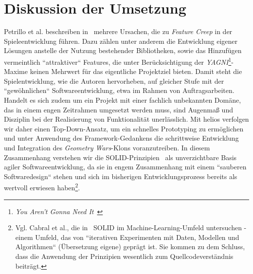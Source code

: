 \section{Diskussion der Umsetzung}

Petrillo et al. beschreiben in~\cite[]{PPTD08} mehrere Ursachen, die zu \textit{Feature Creep} in der Spieleentwicklung führen.
Dazu zählen unter anderem die Entwicklung eigener Lösungen anstelle der Nutzung bestehender Bibliotheken, sowie das Hinzufügen vermeintlich ``attraktiver`` Features, die unter Berücksichtigung der \textit{YAGNI}\footnote{\textit{You Aren't Gonna Need It}~\cite[]{Sch07}}-Maxime keinen Mehrwert für das eigentliche Projektziel bieten.
Damit steht die Spielentwicklung, wie die Autoren hervorheben, auf gleicher Stufe mit der ``gewöhnlichen`` Softwareentwicklung, etwa im Rahmen von Auftragsarbeiten.
Handelt es sich zudem um ein Projekt mit einer fachlich unbekannten Domäne, das in einem engen Zeitrahmen umgesetzt werden muss, sind Augenmaß und Disziplin bei der Realisierung von Funktionalität unerlässlich.
Mit helios verfolgen wir daher einen Top-Down-Ansatz, um ein schnelles Prototyping zu ermöglichen und unter Anwendung des Framework-Gedankens die schrittweise Entwicklung und Integration des \textit{Geometry Wars}-Klons voranzutreiben.
In diesem Zusammenhang verstehen wir die SOLID-Prinzipien~\cite[]{Mar03} als unverzichtbare Basis agiler Softwareentwicklung, da sie in engem Zusammenhang mit einem ``sauberen Softwaredesign`` stehen und sich im bisherigen Entwicklungsprozess bereits als wertvoll erwiesen haben\footnote{Vgl. Cabral et al., die in~\cite[]{CKME+24} SOLID im Machine-Learning-Umfeld untersuchen - einem Umfeld, das von ``iterativen Experimenten mit Daten, Modellen und Algorithmen`` (Übersetzung eigene) geprägt ist. Sie kommen zu dem Schluss, dass die Anwendung der Prinzipien wesentlich zum Quellcodeverständnis beiträgt.}.\par

